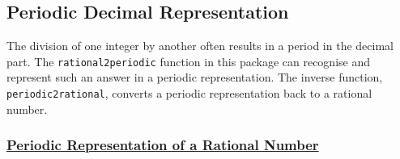 

\subsection{Periodic Decimal Representation}
\label{sec:rataprx}

The division of one integer by another often results in
a period in the decimal part. The \texttt{rational2periodic}
function in this package can recognise and represent
such an answer in a periodic representation. The inverse
function, \texttt{periodic2rational}, converts a
periodic representation back to a rational number.

\hypertarget{operator:RATIONAL2PERIODIC}{}
\hypertarget{operator:PERIODIC2RATIONAL}{}
\hypertarget{operator:PERIODIC}{}

\subsubsection*{\textbf{\underline{Periodic Representation of a Rational Number}}}


